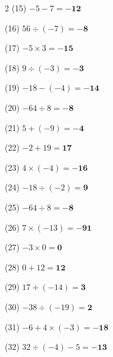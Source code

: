 \documentclass[a4paper, 11pt]{ltjsarticle}
\begin{document}
\begin{multicols*}{2}
\noindent (15) \quad $-5-7 = \mathbf{-12}$
\vspace*{\fill}

\noindent (16) \quad $56\div(-7) = \mathbf{-8}$
\vspace*{\fill}

\noindent (17) \quad $-5\times3 = \mathbf{-15}$
\vspace*{\fill}

\noindent (18) \quad $9\div(-3) = \mathbf{-3}$
\vspace*{\fill}

\noindent (19) \quad $-18-(-4) = \mathbf{-14}$
\vspace*{\fill}

\noindent (20) \quad $-64\div8 = \mathbf{-8}$
\vspace*{\fill}
\columnbreak

\noindent (21) \quad $5+(-9) = \mathbf{-4}$
\vspace*{\fill}

\noindent (22) \quad $-2+19 = \mathbf{17}$
\vspace*{\fill}

\noindent (23) \quad $4\times(-4) = \mathbf{-16}$
\vspace*{\fill}

\noindent (24) \quad $-18\div(-2) = \mathbf{9}$
\vspace*{\fill}

\noindent (25) \quad $-64\div8 = \mathbf{-8}$
\vspace*{\fill}

\noindent (26) \quad $7\times(-13) = \mathbf{-91}$
\vspace*{\fill}

\noindent (27) \quad $-3\times0 = \mathbf{0}$
\vspace*{\fill}

\noindent (28) \quad $0+12 = \mathbf{12}$
\vspace*{\fill}

\noindent (29) \quad $17+(-14) = \mathbf{3}$
\vspace*{\fill}

\noindent (30) \quad $-38\div(-19) = \mathbf{2}$
\vspace*{\fill}
\columnbreak

\noindent (31) \quad $-6+4\times(-3) = \mathbf{-18}$
\vspace*{\fill}

\noindent (32) \quad $32\div(-4)-5 = \mathbf{-13}$
\vspace*{\fill}


\end{multicols*}
\end{document}
